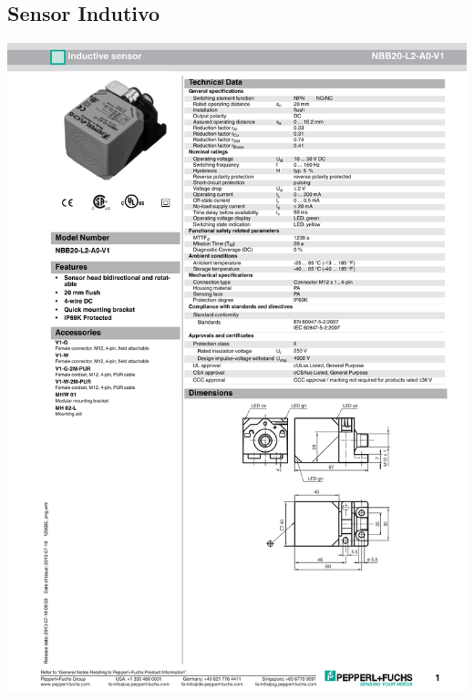 \subsection{Sensor Indutivo}
\includegraphics[width=.9\columnwidth]{figs/datasheets/inductive.pdf}

